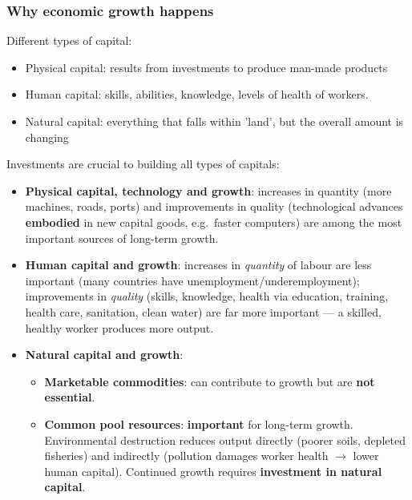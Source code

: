 \subsubsection*{Why economic growth happens}
Different types of capital:
\begin{itemize}
  \item Physical capital: results from investments to produce man-made products
  \item Human capital: skills, abilities, knowledge, levels of health of workers.
  \item Natural capital: everything that falls within 'land', but the overall amount is changing
\end{itemize}
Investments are crucial to building all types of capitals:
\begin{itemize}
  \item \textbf{Physical capital, technology and growth}: increases in quantity (more machines, roads, ports) and improvements in quality (technological advances \textbf{embodied} in new capital goods, e.g.\ faster computers) are among the most important sources of long-term growth.
  \item \textbf{Human capital and growth}: increases in \textit{quantity} of labour are less important (many countries have unemployment/underemployment); improvements in \textit{quality} (skills, knowledge, health via education, training, health care, sanitation, clean water) are far more important --- a skilled, healthy worker produces more output.
  \item \textbf{Natural capital and growth}:
  \begin{itemize}
    \item \textbf{Marketable commodities}: can contribute to growth but are \textbf{not essential}.
    \item \textbf{Common pool resources}: \textbf{important} for long-term growth. Environmental destruction reduces output directly (poorer soils, depleted fisheries) and indirectly (pollution damages worker health $\to$ lower human capital). Continued growth requires \textbf{investment in natural capital}.
  \end{itemize}
\end{itemize}
